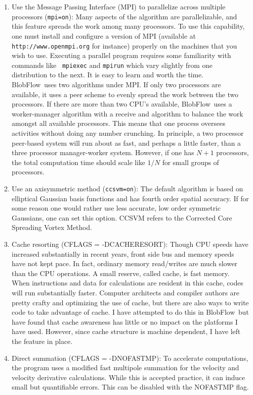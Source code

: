 \documentclass[12pt]{report}
\newcommand{\BF}{BlobFlow}
\begin{document}
\begin{enumerate}

\item Use the Message Passing Interface (MPI) to parallelize across multiple
processors ({\tt mpi=on}): Many aspects of the algorithm are parallelizable, and
this feature spreads the work among many processors.  To use this
capability, one must install and configure a version of MPI (available at {\tt
http://www.openmpi.org} for instance) properly on the machines that you wish to
use.
Executing a parallel program requires some familiarity with commands like {\tt
mpiexec} and {\tt mpirun} which vary slightly from one distribution to the next.
It is
easy to learn and worth the time.  \BF~uses two algorithms under MPI.
If only two processors are available, it uses a peer scheme to evenly
spread the work between the two processors.  If there are more than two
CPU's available, \BF~uses a worker-manager algorithm with a receive and
algorithm to balance the work amongst all available processors.  This
means that one process oversees activities
without doing any number crunching.  In principle, a two processor peer-based
system will run about as fast, and perhaps a little faster, than a three
processor manager-worker system.  However, if one has $N+1$ processors, the
total computation time should scale like $1/N$ for small groups of processors.

\item Use an axisymmetric method ({\tt ccsvm=on}):  The default algorithm is
based on elliptical Gaussian basis functions and has fourth order spatial
accuracy. If for some reason one would rather use less accurate, low order
symmetric Gaussians, one can set this option.  CCSVM refers to the Corrected
Core Spreading Vortex Method.

\item Cache resorting (CFLAGS = -DCACHERESORT): Though CPU speeds have increased
substantially in recent years, front side bus and memory speeds have not
kept pace.  In fact, ordinary memory read/writes are much slower than the CPU
operations. A small reserve, called cache, is fast
memory.  When instructions and data for calculations are resident in this
cache, codes will run substantially faster.  Computer architects and
compiler authors are pretty crafty and optimizing the use of cache, but
there are also ways to write code to take advantage of cache.  I have
attempted to do this in \BF~but have found that cache awareness has
little or no impact on the platforms I have used.  However, since cache
structure is machine dependent, I have left the feature in place.

\item Direct summation (CFLAGS = -DNOFASTMP):  To accelerate computations, the
program uses a modified fast multipole summation for the velocity and velocity
derivative calculations.  While this is accepted practice, it can induce
small but quantifiable errors.  This can be disabled with the NOFASTMP flag.

\end{enumerate}
\end{document}
